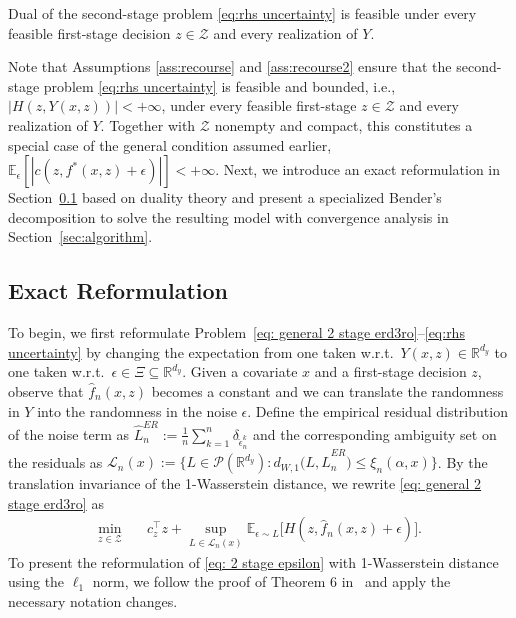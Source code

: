 \documentclass[onefignum,onetabnum]{siamart251216}
\begin{document}
\begin{assumption}
\label{ass:recourse2}
    Dual of the second-stage problem \eqref{eq:rhs uncertainty} is feasible under every feasible first-stage decision $z \in \mathcal{Z}$ and every realization of $Y$.
\end{assumption}

Note that Assumptions \ref{ass:recourse} and \ref{ass:recourse2} ensure that the second-stage problem \eqref{eq:rhs uncertainty} is feasible and bounded, i.e., $|H(z,Y(x,z))|<+\infty$, under every feasible first-stage $z \in \mathcal{Z}$ and every realization of $Y$. Together with $\mathcal{Z}$ nonempty and compact, this constitutes a special case of the general condition assumed earlier, $\mathbb{E}_\epsilon[|c(z,f^*(x,z) + \epsilon)|] <+\infty$. 
Next, we introduce an exact reformulation in Section~\ref{sec:reformulation} based on duality theory and present a specialized Bender's decomposition to solve the resulting model with convergence analysis in Section~\ref{sec:algorithm}.

\subsection{Exact Reformulation}
\label{sec:reformulation}

To begin, we first reformulate Problem~\eqref{eq: general 2 stage erd3ro}--\eqref{eq:rhs uncertainty} by changing the expectation from one taken w.r.t.\ $Y(x,z) \in \mathbb{R}^{d_y}$ to one taken w.r.t.\ $\epsilon \in \Xi \subseteq\mathbb R^{d_y}$.
Given a covariate $x$ and a first-stage decision $z$, observe that $\hat{f}_n(x,z)$ becomes a constant and we can translate the randomness in $Y$ into the randomness in the noise $\epsilon$. Define the empirical residual distribution of the noise term as $\hat L_n^{ER}:=\frac1n\sum_{k=1}^n \delta_{\hat\epsilon_n^{k}}$ 
and the corresponding ambiguity set on the residuals as $
\mathcal L_n(x):=\bigl\{L\in\mathcal P(\mathbb{R}^{d_y}): d_{W,1}\bigl(L,\hat L_n^{ER}\bigr)\le \xi_n(\alpha,x)\bigr\}$.
By the translation invariance of the 1-Wasserstein distance, we rewrite \eqref{eq: general 2 stage erd3ro} as
\begin{align}\label{eq: 2 stage epsilon}
    \min_{z\in\mathcal{Z}} \quad & c_z^\top z + \sup_{L \in \mathcal{L}_n(x)}\mathbb{E}_{\epsilon \sim L}\bigl[H(z,\hat{f}_n(x,z) + \epsilon)\bigr].
\end{align}
To present the reformulation of \eqref{eq: 2 stage epsilon} with 1-Wasserstein distance using the $\ell_1$ norm, we follow the proof of Theorem 6 in\ \cite{hanasusanto2018conic} and apply the necessary notation changes. 
\end{document}
